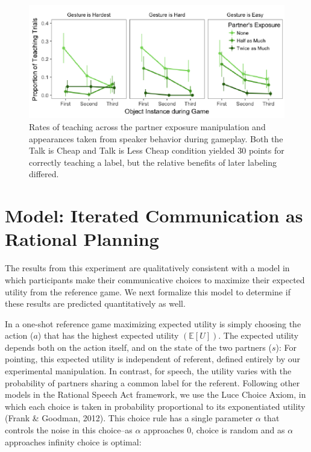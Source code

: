 \documentclass[10pt, letterpaper]{article}
\newenvironment{CodeChunk}{}{}
\begin{document}
\begin{CodeChunk}
\begin{figure}[H]

{\centering \includegraphics{figs/imp_teach-1} 

}

\caption[Rates of teaching across the partner exposure manipulation and appearances taken from speaker behavior during gameplay]{Rates of teaching across the partner exposure manipulation and appearances taken from speaker behavior during gameplay. Both the Talk is Cheap and Talk is Less Cheap condition yielded 30 points for correctly teaching a label, but the relative benefits of later labeling differed.}\label{fig:imp_teach}
\end{figure}
\end{CodeChunk}

\section{Model: Iterated Communication as Rational
Planning}\label{model-iterated-communication-as-rational-planning}

The results from this experiment are qualitatively consistent with a
model in which participants make their communicative choices to maximize
their expected utility from the reference game. We next formalize this
model to determine if these results are predicted quantitatively as
well.

\newcommand{\E}[1]{\mathbb{E}\left[ #1 \right]}

In a one-shot reference game maximizing expected utility is simply
choosing the action (\(a\)) that has the highest expected utility
\((\E{U})\). The expected utility depends both on the action itself, and
on the state of the two partners (\(s\)): For pointing, this expected
utility is independent of referent, defined entirely by our experimental
manipulation. In contrast, for speech, the utility varies with the
probability of partners sharing a common label for the referent.
Following other models in the Rational Speech Act framework, we use the
Luce Choice Axiom, in which each choice is taken in probability
proportional to its exponentiated utility (Frank \& Goodman, 2012). This
choice rule has a single parameter \(\alpha\) that controls the noise in
this choice--as \(\alpha\) approaches 0, choice is random and as
\(\alpha\) approaches infinity choice is optimal:
\end{document}
